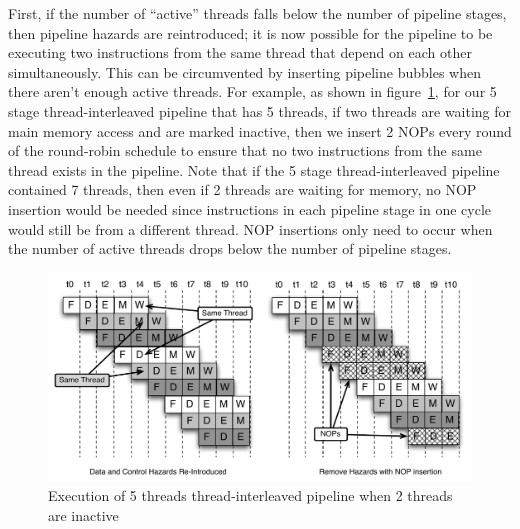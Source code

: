 First, if the number of ``active'' threads falls below the number of pipeline stages, then pipeline hazards are reintroduced; it is now possible for the pipeline to be executing two instructions from the same thread that depend on each other simultaneously. 
This can be circumvented by inserting pipeline bubbles when there aren't enough active threads. 
For example, as shown in figure~\ref{fig:three_thread_pipeline}, for our 5 stage thread-interleaved pipeline that has 5 threads, if two threads are waiting for main memory access and are marked inactive, then we insert 2 NOPs every round of the round-robin schedule to ensure that no two instructions from the same thread exists in the pipeline.
Note that if the 5 stage thread-interleaved pipeline contained 7 threads, then even if 2 threads are waiting for memory, no NOP insertion would be needed since instructions in each pipeline stage in one cycle would still be from a different thread.   
NOP insertions only need to occur when the number of active threads drops below the number of pipeline stages.   
\begin{figure}
  \vspace{-20pt}
  \begin{center}
    \includegraphics[scale=.6]{figs/three_thread_pipeline}
  \end{center}
  \vspace{-20pt}
  \caption{Execution of 5 threads thread-interleaved pipeline when 2 threads are inactive}
  \label{fig:three_thread_pipeline}
\end{figure}

